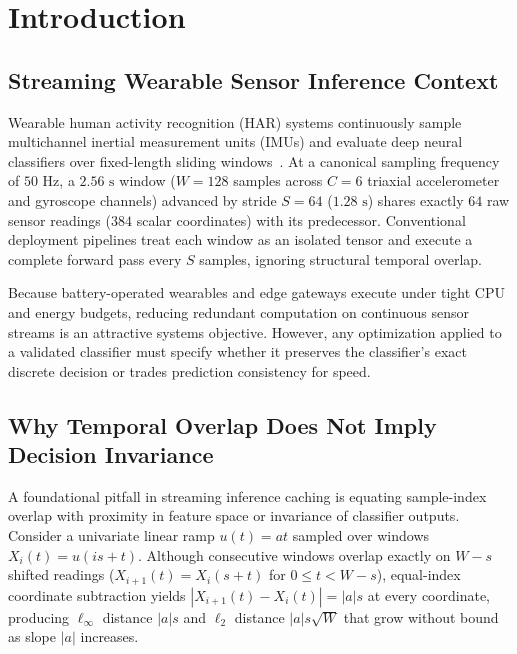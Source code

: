 \documentclass[11pt,oneside,a4paper]{report}
\newcommand{\abs}[1]{\left\lvert #1\right\rvert}
\theoremstyle{remark}
\begin{document}
\clearpage
{}

\chapter{Introduction}

\section{Streaming Wearable Sensor Inference Context}
Wearable human activity recognition (HAR) systems continuously sample multichannel inertial measurement units (IMUs) and evaluate deep neural classifiers over fixed-length sliding windows~\cite{reyesortiz2015hapt,reyes2016transition}. At a canonical sampling frequency of $50\text{ Hz}$, a $2.56\text{ s}$ window ($W=128$ samples across $C=6$ triaxial accelerometer and gyroscope channels) advanced by stride $S=64$ ($1.28\text{ s}$) shares exactly $64$ raw sensor readings ($384$ scalar coordinates) with its predecessor. Conventional deployment pipelines treat each window as an isolated tensor and execute a complete forward pass every $S$ samples, ignoring structural temporal overlap.

Because battery-operated wearables and edge gateways execute under tight CPU and energy budgets, reducing redundant computation on continuous sensor streams is an attractive systems objective. However, any optimization applied to a validated classifier must specify whether it preserves the classifier's exact discrete decision or trades prediction consistency for speed.

\section{Why Temporal Overlap Does Not Imply Decision Invariance}
A foundational pitfall in streaming inference caching is equating sample-index overlap with proximity in feature space or invariance of classifier outputs. Consider a univariate linear ramp $u(t) = a t$ sampled over windows $X_i(t) = u(is + t)$. Although consecutive windows overlap exactly on $W-s$ shifted readings ($X_{i+1}(t) = X_i(s+t)$ for $0 \le t < W-s$), equal-index coordinate subtraction yields $\abs{X_{i+1}(t) - X_i(t)} = \abs{a}s$ at every coordinate, producing $\ell_\infty$ distance $\abs{a}s$ and $\ell_2$ distance $\abs{a}s\sqrt{W}$ that grow without bound as slope $\abs{a}$ increases.
\end{document}

